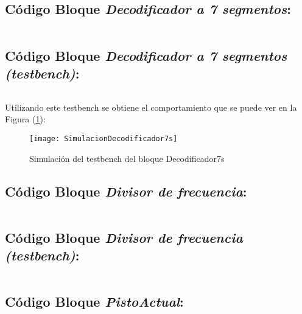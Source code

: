 \subsection{Código Bloque \textit{Decodificador a 7 segmentos}:} \label{code:Decodificador7s}
	\inputminted[frame=lines,fontsize=\footnotesize,linenos]{vhdl}{CodeFiles/Decodificador7s.vhd}

\subsection{Código Bloque \textit{Decodificador a 7 segmentos (testbench)}:} \label{code:Decodificador7s_tb}
	
	\inputminted[frame=lines,fontsize=\footnotesize,linenos]{vhdl}{CodeFiles/Decodificador7s_tb.vhd}
	
	Utilizando este testbench se obtiene el comportamiento que se puede ver en la Figura (\ref{fig:SimulacionDecodificador7s}):

    \begin{figure}[H]
		    \centering
		    \texttt{[image: SimulacionDecodificador7s]}
		    \caption{Simulación del testbench del bloque Decodificador7s}
		    \label{fig:SimulacionDecodificador7s}
	\end{figure}

\subsection{Código Bloque \textit{Divisor de frecuencia}:} \label{code:DivisorFrecuencia}
	\inputminted[frame=lines,fontsize=\footnotesize,linenos]{vhdl}{CodeFiles/DivisorFrecuencia.vhd}

\subsection{Código Bloque \textit{Divisor de frecuencia (testbench)}:} \label{code:DivisorFrecuencia_Tb}
	\inputminted[frame=lines,fontsize=\footnotesize,linenos]{vhdl}{CodeFiles/DivisorFrecuencia_tb.vhd}

\subsection{Código Bloque \textit{PistoActual}:} \label{code:PisoActual}
    \inputminted[frame=lines,fontsize=\footnotesize,linenos]{vhdl}{CodeFiles/PisoActual.vhd}
    

